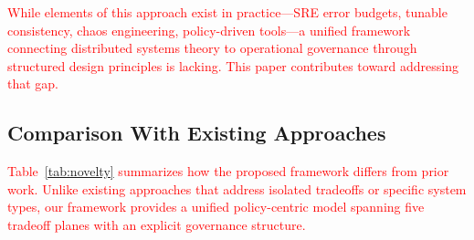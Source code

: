 \documentclass[conference]{IEEEtran}
\begin{document}
\textcolor{red}{While elements of this approach exist in practice---SRE error budgets, tunable consistency, chaos engineering, policy-driven tools---a unified framework connecting distributed systems theory to operational governance through structured design principles is lacking. This paper contributes toward addressing that gap.}

\subsection{Comparison With Existing Approaches}

\textcolor{red}{Table~\ref{tab:novelty} summarizes how the proposed framework differs from prior work. Unlike existing approaches that address isolated tradeoffs or specific system types, our framework provides a unified policy-centric model spanning five tradeoff planes with an explicit governance structure.}
\end{document}
